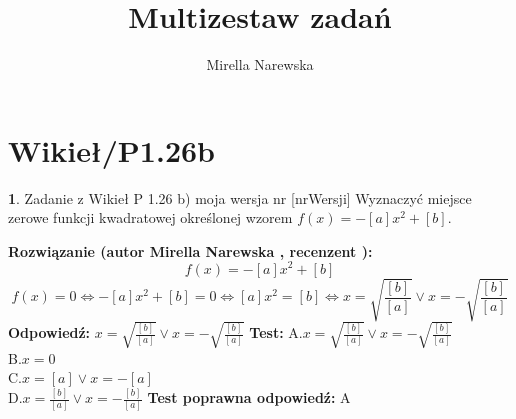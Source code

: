 \documentclass[12pt, a4paper]{article}
\title{Multizestaw zadań}
\author{Mirella Narewska}
\date{}
\theoremstyle{definition} %
\newtheorem{zad}{}
\newcommand{\kategoria}[1]{\section{#1}} %
\newcommand{\zadStart}[1]{\begin{zad}#1\newline} %
\newcommand{\zadStop}{\end{zad}}   %
\newcommand{\rozwStart}[2]{\noindent \textbf{Rozwiązanie (autor #1 , recenzent #2): }\newline} %
\newcommand{\rozwStop}{\newline}                                            %
\newcommand{\odpStart}{\noindent \textbf{Odpowiedź:}\newline}    %
\newcommand{\odpStop}{\newline}                                             %
\newcommand{\testStart}{\noindent \textbf{Test:}\newline} %
\newcommand{\testStop}{\newline} %
\newcommand{\kluczStart}{\noindent \textbf{Test poprawna odpowiedź:}\newline} %
\newcommand{\kluczStop}{\newline} %
\begin{document}
\maketitle


\kategoria{Wikieł/P1.26b}
\zadStart{Zadanie z Wikieł P 1.26 b) moja wersja nr [nrWersji]}
Wyznaczyć miejsce zerowe funkcji kwadratowej określonej wzorem $f(x)=-[a]x^2+[b]$.
\zadStop
\rozwStart{Mirella Narewska}{}
$$f(x)=-[a]x^2+[b]$$ 
$$f(x)=0 \Leftrightarrow -[a]x^2+[b]=0 \Leftrightarrow [a]x^2=[b] \Leftrightarrow x=\sqrt{\frac{[b]}{[a]}} \vee x=-\sqrt{\frac{[b]}{[a]}}  $$ 
\rozwStop
\odpStart
$x=\sqrt{\frac{[b]}{[a]}} \vee x=-\sqrt{\frac{[b]}{[a]}}$
\odpStop
\testStart
A.$x=\sqrt{\frac{[b]}{[a]}} \vee x=-\sqrt{\frac{[b]}{[a]}}$
\\
B.$x=0$
\\
C.$x=[a] \vee x=-[a]$
\\
D.$x=\frac{[b]}{[a]} \vee x=-\frac{[b]}{[a]}$
\testStop
\kluczStart
A
\kluczStop
\end{document}
